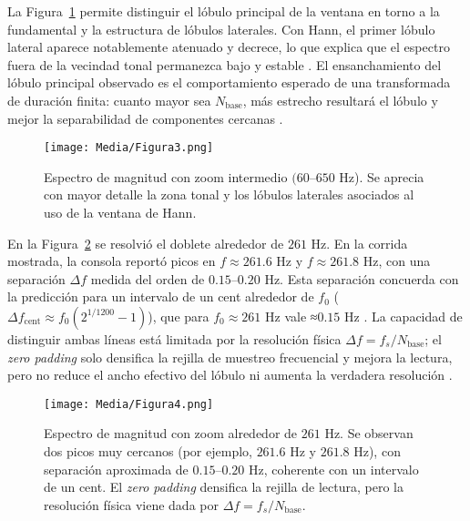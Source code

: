 \documentclass[letter,12pt]{article}
\begin{document}
La Figura~\ref{fig:exp1-mag-mid} permite distinguir el lóbulo principal de la ventana en torno a la fundamental y la estructura de lóbulos laterales. Con Hann, el primer lóbulo lateral aparece notablemente atenuado y decrece, lo que explica que el espectro fuera de la vecindad tonal permanezca bajo y estable \cite{Harris1978Windows}. El ensanchamiento del lóbulo principal observado es el comportamiento esperado de una transformada de duración finita: cuanto mayor sea \(N_{\text{base}}\), más estrecho resultará el lóbulo y mejor la separabilidad de componentes cercanas \cite{OppenheimSchaferDTSP3e}. 
\begin{figure}[H]
  \centering
  \texttt{[image: Media/Figura3.png]}
  \caption{Espectro de magnitud con zoom intermedio \((60\)–\(650\) Hz). Se aprecia con mayor detalle la zona tonal y los lóbulos laterales asociados al uso de la ventana de Hann.}
  \label{fig:exp1-mag-mid}
\end{figure}

En la Figura~\ref{fig:exp1-mag-zoom} se resolvió el doblete alrededor de \(261\) Hz. En la corrida mostrada, la consola reportó picos en \(f\approx 261.6\) Hz y \(f\approx 261.8\) Hz, con una separación \(\Delta f\) medida del orden de \(0.15\)–\(0.20\) Hz. Esta separación concuerda con la predicción para un intervalo de un cent alrededor de \(f_0\) (\(\Delta f_{\text{cent}} \approx f_0(2^{1/1200}-1)\)), que para \(f_0\approx 261\) Hz vale ≈\(0.15\) Hz \cite{OsgoodFTAMS2019}. La capacidad de distinguir ambas líneas está limitada por la resolución física \(\Delta f=f_s/N_{\text{base}}\); el \emph{zero padding} solo densifica la rejilla de muestreo frecuencial y mejora la lectura, pero no reduce el ancho efectivo del lóbulo ni aumenta la verdadera resolución \cite{OppenheimSchaferDTSP3e,Harris1978Windows}.

\begin{figure}[H]
  \centering
  \texttt{[image: Media/Figura4.png]}
  \caption{Espectro de magnitud con zoom alrededor de \(261\) Hz. Se observan dos picos muy cercanos (por ejemplo, \(261.6\) Hz y \(261.8\) Hz), con separación aproximada de \(0.15\)–\(0.20\) Hz, coherente con un intervalo de un cent. El \emph{zero padding} densifica la rejilla de lectura, pero la resolución física viene dada por \(\Delta f=f_s/N_{\text{base}}\).}
  \label{fig:exp1-mag-zoom}
\end{figure}
\end{document}
